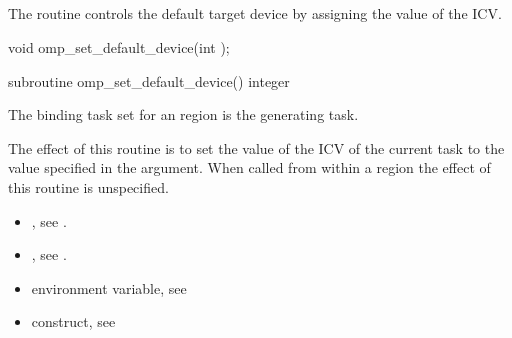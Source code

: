 


\subsection{}
\label{subsec:omp_set_default_device}

\summary

The  routine controls the default target device by
assigning the value of the  ICV.

\format
\begin{ccppspecific}
\begin{ompcFunction}
void omp_set_default_device(int );
\end{ompcFunction}
\end{ccppspecific}

\begin{fortranspecific}
\begin{ompfSubroutine}
subroutine omp_set_default_device()
integer 
\end{ompfSubroutine}
\end{fortranspecific}

\binding
The binding task set for an  region is the generating
task.

\effect
The effect of this routine is to set the value of the  ICV of the current
task to the value specified in the argument. When called from within a  region
the effect of this routine is unspecified.

\crossreferences
\begin{itemize}
\item {}, see
.

\item {}, see
.

\item {} environment variable, see

\item {} construct, see

\end{itemize}










